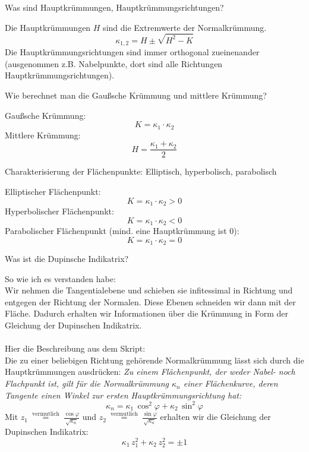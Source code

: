 \documentclass[twocolumn, fontsize=8pt, DIV=1]{scrartcl}
\begin{document}
\begin{framed}
    Was sind Hauptkrümmungen, Hauptkrümmungsrichtungen?
\end{framed}
Die Hauptkrümmungen $H$ sind die Extremwerte der Normalkrümmung.
\[
    \kappa_{1,2} = H \pm \sqrt{H^2 - K}
\]
Die Hauptkrümmungsrichtungen sind immer orthogonal zueinenander (ausgenommen z.B. Nabelpunkte, dort sind alle Richtungen Hauptkrümmungsrichtungen).



\begin{framed}
    Wie berechnet man die Gaußsche Krümmung und mittlere Krümmung?
\end{framed}
Gaußsche Krümmung:
\[
    K = \kappa_1 \cdot \kappa_2
\]
Mittlere Krümmung:
\[
    H = \frac{\kappa_1 + \kappa_2}{2}
\]



\begin{framed}
    Charakterisierung der Flächenpunkte: Elliptisch, hyperbolisch, parabolisch
\end{framed}
Elliptischer Flächenpunkt:
\[
    K = \kappa_1 \cdot \kappa_2 > 0
\]
Hyperbolischer Flächenpunkt:
\[
    K = \kappa_1 \cdot \kappa_2 < 0
\]
Parabolischer Flächenpunkt (mind. eine Hauptkrümmung ist $0$):
\[
    K = \kappa_1 \cdot \kappa_2 = 0
\]



\begin{framed}
    Was ist die Dupinsche Indikatrix?
\end{framed}
So wie ich es verstanden habe:\\
Wir nehmen die Tangentialebene und schieben sie infitessimal in Richtung und entgegen der Richtung der Normalen. Diese Ebenen schneiden wir dann mit der Fläche. Dadurch erhalten wir Informationen über die Krümmung in Form der Gleichung der Dupinschen Indikatrix.\\
\\
Hier die Beschreibung aus dem Skript:\\
Die zu einer beliebigen Richtung gehörende Normalkrümmung lässt sich durch die Hauptkrümmungen ausdrücken:
\textit{Zu einem Flächenpunkt, der weder Nabel- noch Flachpunkt ist, gilt für die Normalkrümmung $\kappa_n$ einer Flächenkurve, deren Tangente einen Winkel zur ersten Hauptkrümmungsrichtung hat:}
\[
    \kappa_n = \kappa_1\, \cos^2 \varphi + \kappa_2\, \sin^2 \varphi
\]
Mit $z_1\ \overset{\text{vermutlich}}{=}\ \frac{\cos\varphi}{\sqrt{\kappa_n}}$ und $z_2\ \overset{\text{vermutlich}}{=}\ \frac{\sin\varphi}{\sqrt{\kappa_n}}$ erhalten wir die Gleichung der Dupinschen Indikatrix:
\[
    \kappa_1\, z_1^2 + \kappa_2\, z_2^2 = \pm 1
\]
\end{document}
